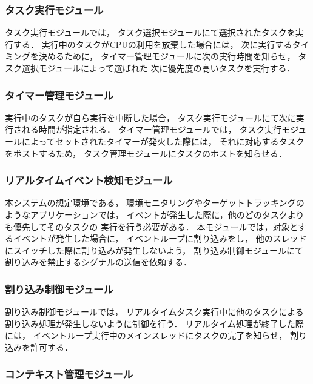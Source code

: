 \subsubsection{タスク実行モジュール}

\vspace{0.5em}タスク実行モジュールでは，
タスク選択モジュールにて選択されたタスクを実行する．
実行中のタスクがCPUの利用を放棄した場合には，
次に実行するタイミングを決めるために，
タイマー管理モジュールに次の実行時間を知らせ，
タスク選択モジュールによって選ばれた
次に優先度の高いタスクを実行する．



\subsubsection{タイマー管理モジュール}

\vspace{0.5em}実行中のタスクが自ら実行を中断した場合，
タスク実行モジュールにて次に実行される時間が指定される．
タイマー管理モジュールでは，
タスク実行モジュールによってセットされたタイマーが発火した際には，
それに対応するタスクをポストするため，
タスク管理モジュールにタスクのポストを知らせる．


\subsubsection{リアルタイムイベント検知モジュール}

\vspace{0.5em}本システムの想定環境である，
環境モニタリングやターゲットトラッキングのようなアプリケーションでは，
イベントが発生した際に，他のどのタスクよりも優先してそのタスクの
実行を行う必要がある．
本モジュールでは，対象とするイベントが発生した場合に，
イベントループに割り込みをし，
他のスレッドにスイッチした際に割り込みが発生しないよう，
割り込み制御モジュールにて割り込みを禁止するシグナルの送信を依頼する．


\subsubsection{割り込み制御モジュール}

\vspace{0.5em}割り込み制御モジュールでは，
リアルタイムタスク実行中に他のタスクによる
割り込み処理が発生しないように制御を行う．
リアルタイム処理が終了した際には，
イベントループ実行中のメインスレッドにタスクの完了を知らせ，
割り込みを許可する．


\subsubsection{コンテキスト管理モジュール}

